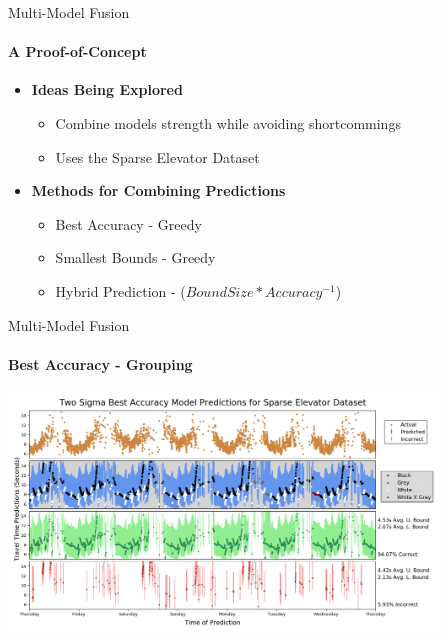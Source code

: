 \documentclass{beamer}
\begin{document}
\begin{frame}[t]{Multi-Model Fusion}
  \framesubtitle{A Proof-of-Concept}
  \vspace*{0.50cm}

  \begin{itemize}
    \setlength\itemsep{1em}

  \item \textbf{Ideas Being Explored}
    \begin{itemize}
      \item Combine models strength while avoiding shortcommings
      \item Uses the Sparse Elevator Dataset
    \end{itemize}
  \vspace*{0.50cm}

  \item \textbf{Methods for Combining Predictions}
    \begin{itemize}
      \item Best Accuracy - Greedy
      \item Smallest Bounds - Greedy
      \item Hybrid Prediction - ($Bound Size * Accuracy^{-1}$)
    \end{itemize}
  \end{itemize}
\end{frame}




\begin{frame}[t]{Multi-Model Fusion}
  \framesubtitle{Best Accuracy - Grouping}

  {\includegraphics[width = 4.5in]{images/redux/two_sigma_best_accuracy_model_predictions_for_sparse_elevator_dataset.png}}

\end{frame}
\end{document}
